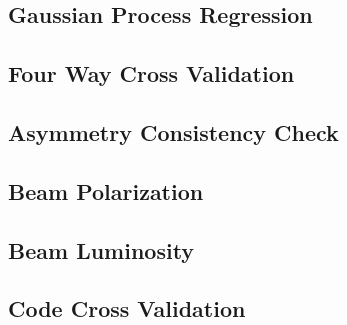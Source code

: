 \subsection{Gaussian Process Regression}
\subsection{Four Way Cross Validation}
\subsection{Asymmetry Consistency Check}
\subsection{Beam Polarization}
\subsection{Beam Luminosity}
\subsection{Code Cross Validation}
